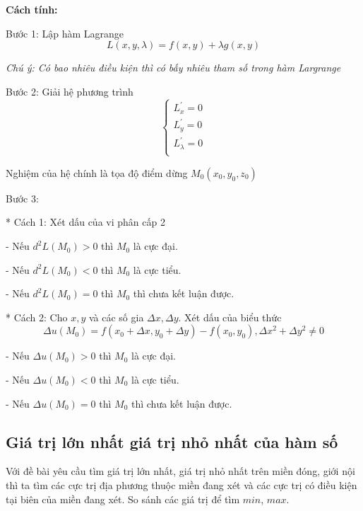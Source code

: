 \documentclass[12pt, a4paper]{article}
\begin{document}
	\textbf {Cách tính:}
	
	Bước 1: Lập hàm Lagrange  \[ L(x,y,\lambda) = f(x,y) + \lambda g(x,y) \]

	\textit {Chú ý: Có bao nhiêu điều kiện thì có bấy nhiêu tham số trong hàm Largrange}


	Bước 2: Giải hệ phương trình
	\[ \begin{cases}
		L^{'}_x=0 \\
		L^{'}_y=0 \\
		L^{'}_\lambda=0 \\
	\end{cases} \]
	
	Nghiệm của hệ chính là tọa độ điểm dừng $ M_0(x_0,y_0,z_0) $
	
	Bước 3:
	
	* Cách 1: Xét dấu của vi phân cấp 2 
	
	- Nếu $ d^2L(M_0) >0 $ thì $ M_0 $ là cực đại.
	
	- Nếu $ d^2L(M_0) <0 $ thì $ M_0 $ là cực tiểu.
	
	- Nếu $ d^2L(M_0) =0 $ thì $ M_0 $ thì chưa kết luận được.
	
	\medskip
	
	* Cách 2: Cho $ x, y $ và các số gia $ \Delta x, \Delta y $. Xét dấu của biểu thức \[ \Delta u(M_0) = f(x_0+\Delta x, y_0+\Delta y) - f(x_0,y_0) , \Delta x^2 + \Delta y^2 \ne 0 \]
	
	- Nếu $ \Delta u(M_0) >0 $ thì $ M_0 $ là cực đại.
	
	- Nếu $ \Delta u(M_0) <0 $ thì $ M_0 $ là cực tiểu.
	
	- Nếu $ \Delta u(M_0) =0 $ thì $ M_0 $ thì chưa kết luận được.
	
	\subsection{Giá trị lớn nhất giá trị nhỏ nhất của hàm số}
	Với đề bài yêu cầu tìm giá trị lớn nhất, giá trị nhỏ nhất trên miền đóng, giới nội thì ta tìm các cực trị địa phương thuộc miền đang xét và các cực trị có điều kiện tại biên của miền đang xét. So sánh các giá trị để tìm $ min $, $ max $.
	
\end{document}

